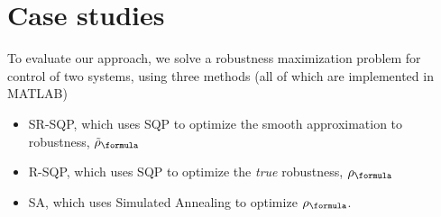 \section{Case studies}
\label{sec:case study}

To evaluate our approach, we solve a robustness maximization problem for control of two systems, using three methods (all of which are implemented in MATLAB)

\begin{itemize}
	\vspace{-5pt}
	\item SR-SQP, which uses SQP to optimize the smooth approximation to robustness, $\srobf$
	\vspace{-5pt}
	\item R-SQP, which uses SQP to optimize the \textit{true} robustness, $\robf$
	\vspace{-5pt}
	\item SA, which uses Simulated Annealing to optimize $\robf$.%
	\vspace{-5pt}
\end{itemize}



